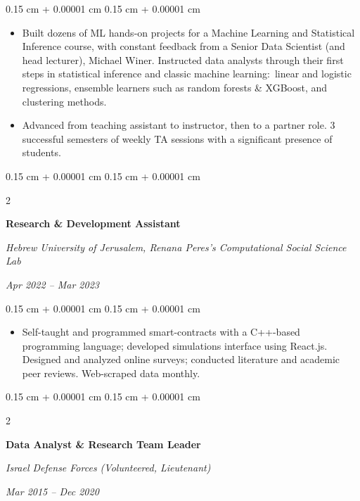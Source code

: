 \documentclass[10pt, letterpaper]{article}
\newenvironment{highlights}{
    \begin{itemize}[
        topsep=0.08 cm,
        parsep=0.08 cm,
        partopsep=0pt,
        itemsep=0pt,
        leftmargin=0.25 cm + 10pt
    ]
}{
    \end{itemize}
} %
\newenvironment{onecolentry}{
    \begin{adjustwidth}{
        0.15 cm + 0.00001 cm
    }{
        0.15 cm + 0.00001 cm
    }
}{
    \end{adjustwidth}
} %
\newenvironment{twocolentry}[2][]{
    \onecolentry
    \def\secondColumn{#2}
    \setcolumnwidth{\fill, 4.5 cm}
    \begin{paracol}{2}
}{
    \switchcolumn \raggedleft \secondColumn
    \end{paracol}
    \endonecolentry
} %
\begin{document}
        \vspace{0.08 cm}
        \begin{onecolentry}
            \begin{highlights}
                \item Built dozens of ML hands-on projects for a Machine Learning and Statistical Inference course, with constant feedback from a Senior Data Scientist (and head lecturer), Michael Winer. Instructed data analysts through their first steps in statistical inference and classic machine learning$:$ linear and logistic regressions, ensemble learners such as random forests \& XGBoost, and clustering methods.
                \item Advanced from teaching assistant to instructor, then to a partner role. 3 successful semesters of weekly TA sessions with a significant presence of students.
            \end{highlights}
        \end{onecolentry}


        \vspace{0.15 cm}

        \begin{twocolentry}{
            
            
        \textit{Apr 2022 – Mar 2023}}
            \textbf{Research \& Development Assistant}
            
            \textit{Hebrew University of Jerusalem, Renana Peres's Computational Social Science Lab}
        \end{twocolentry}

        \vspace{0.08 cm}
        \begin{onecolentry}
            \begin{highlights}
                \item Self-taught and programmed smart-contracts with a C++-based programming language; developed simulations interface using React.js. Designed and analyzed online surveys; conducted literature and academic peer reviews. Web-scraped data monthly.
            \end{highlights}
        \end{onecolentry}


        \vspace{0.15 cm}

        \begin{twocolentry}{
            
            
        \textit{Mar 2015 – Dec 2020}}
            \textbf{Data Analyst \& Research Team Leader}
            
            \textit{Israel Defense Forces (Volunteered, Lieutenant)}
        \end{twocolentry}
\end{document}
